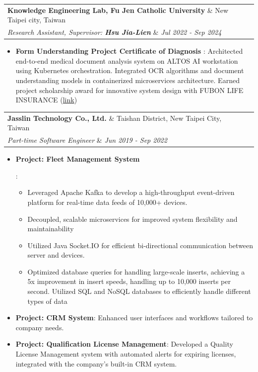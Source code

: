\documentclass[letterpaper,10pt]{article}
\makeatletter
\newcommand{\resumeItem}[2]{
  \item\small{
    \textbf{#1}{: #2 \vspace{-2pt}}
  }
}
\newcommand{\resumeSubheading}[4]{
  \vspace{-1pt}\item[]
  \begin{tabular*}{0.98\textwidth}{l@{\extracolsep{\fill}}r}
      \hspace{-10pt}\textbf{#1} \& #2 \\
      \hspace{-10pt}\textit{\small#3} \& \textit{\small #4} \\
    \end{tabular*}\vspace{-5pt}
}
\newcommand{\resumeItemListStart}{\begin{itemize}}
\newcommand{\resumeItemListEnd}{\end{itemize}\vspace{-5pt}}
\makeatother
\begin{document}
\resumeSubheading
{Knowledge Engineering Lab, Fu Jen Catholic University}{New Taipei city, Taiwan}
{Research Assistant, Supervisor: \textbf{Hsu Jia-Lien}}{Jul 2022 - Sep 2024}
\resumeItemListStart
\resumeItem{Form Understanding Project Certificate of Diagnosis }
{Architected end-to-end medical document analysis system on ALTOS AI workstation using Kubernetes orchestration.
Integrated OCR algorithms and document understanding models in containerized microservices architecture. Earned project scholarship award for innovative system design with FUBON LIFE INSURANCE
(\href{https://www.fju.edu.tw/focusDetail.jsp?focusID=2285&focusClassID=3&fbclid=IwAR1U61iocx-gGDaxGOqLT-qEkD5vceZsGNmUt_Yr5AQPWskePqsnKosxVh0}{\textcolor{linkblue}{link}})}
\resumeItemListEnd


\resumeSubheading
{Jasslin Technology Co., Ltd.}{Taishan District, New Taipei City, Taiwan}
{Part-time Software Engineer}{Jun 2019 - Sep 2022}
\resumeItemListStart

\resumeItem{Project: Fleet Management System}{
  \begin{itemize}
      \item Leveraged Apache Kafka to develop a high-throughput event-driven platform for real-time data feeds of 10,000+ devices.
      \item Decoupled, scalable microservices for improved system flexibility and maintainability
      \item Utilized Java Socket.IO for efficient bi-directional communication between server and devices.
      \item Optimized database queries for handling large-scale inserts, achieving a 5x improvement in insert speeds, handling up to 10,000 inserts per second. Utilized SQL and NoSQL databases to efficiently handle different types of data
  \end{itemize}
}

\resumeItem{Project: CRM System}{
    Enhanced user interfaces and workflows tailored to company needs.
}

\resumeItem{Project: Qualification License Management}{
    Developed a Quality License Management system with automated alerts for expiring licenses, integrated with the company's built-in CRM system.
}

\resumeItemListEnd
\end{document}
